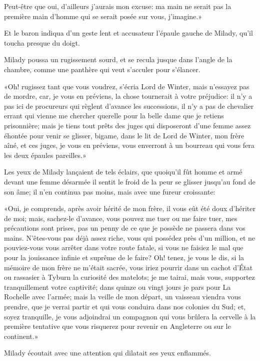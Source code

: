 \speak  Peut-être que oui, d'ailleurs j'aurais mon excuse: ma main ne serait pas la première main d'homme qui se serait posée sur vous, j'imagine.» 

Et le baron indiqua d'un geste lent et accusateur l'épaule gauche de Milady, qu'il toucha presque du doigt. 

Milady poussa un rugissement sourd, et se recula jusque dans l'angle de la chambre, comme une panthère qui veut s'acculer pour s'élancer. 

«Oh! rugissez tant que vous voudrez, s'écria Lord de Winter, mais n'essayez pas de mordre, car, je vous en préviens, la chose tournerait à votre préjudice: il n'y a pas ici de procureurs qui règlent d'avance les successions, il n'y a pas de chevalier errant qui vienne me chercher querelle pour la belle dame que je retiens prisonnière; mais je tiens tout prêts des juges qui disposeront d'une femme assez éhontée pour venir se glisser, bigame, dans le lit de Lord de Winter, mon frère aîné, et ces juges, je vous en préviens, vous enverront à un bourreau qui vous fera les deux épaules pareilles.» 

Les yeux de Milady lançaient de tels éclairs, que quoiqu'il fût homme et armé devant une femme désarmée il sentit le froid de la peur se glisser jusqu'au fond de son âme; il n'en continua pas moins, mais avec une fureur croissante: 

«Oui, je comprends, après avoir hérité de mon frère, il vous eût été doux d'hériter de moi; mais, sachez-le d'avance, vous pouvez me tuer ou me faire tuer, mes précautions sont prises, pas un penny de ce que je possède ne passera dans vos mains. N'êtes-vous pas déjà assez riche, vous qui possédez près d'un million, et ne pouviez-vous vous arrêter dans votre route fatale, si vous ne faisiez le mal que pour la jouissance infinie et suprême de le faire? Oh! tenez, je vous le dis, si la mémoire de mon frère ne m'était sacrée, vous iriez pourrir dans un cachot d'État ou rassasier à Tyburn la curiosité des matelots; je me tairai, mais vous, supportez tranquillement votre captivité; dans quinze ou vingt jours je pars pour La Rochelle avec l'armée; mais la veille de mon départ, un vaisseau viendra vous prendre, que je verrai partir et qui vous conduira dans nos colonies du Sud; et, soyez tranquille, je vous adjoindrai un compagnon qui vous brûlera la cervelle à la première tentative que vous risquerez pour revenir en Angleterre ou sur le continent.» 

Milady écoutait avec une attention qui dilatait ses yeux enflammés. 

